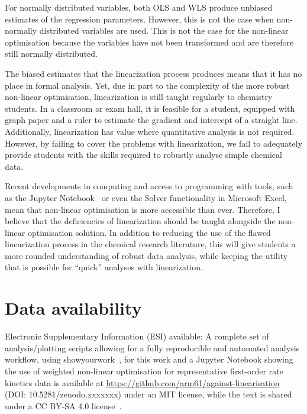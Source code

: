 \documentclass[journal=jceda8,manuscript=article]{achemso}
\begin{document}
For normally distributed variables, both OLS and WLS produce unbiased estimates of the regression parameters. 
However, this is not the case when non-normally distributed variables are used.
This is not the case for the non-linear optimisation because the variables have not been transformed and are therefore still normally distributed. 

The biased estimates that the linearization process produces means that it has no place in formal analysis. 
Yet, due in part to the complexity of the more robust non-linear optimisation, linearization is still taught regularly to chemistry students. 
In a classroom or exam hall, it is feasible for a student, equipped with graph paper and a ruler to estimate the gradient and intercept of a straight line. 
Additionally, linearization has value where quantitative analysis is not required. 
However, by failing to cover the problems with linearization, we fail to adequately provide students with the skills required to robustly analyse simple chemical data. 

Recent developments in computing and access to programming with tools, such as the Jupyter Notebook~\cite{kluyver_jupyter_2016} or even the Solver functionality in Microsoft Excel, mean that non-linear optimisation is more accessible than ever. 
Therefore, I believe that the deficiencies of linearization should be taught alongside the non-linear optimisation solution. 
In addition to reducing the use of the flawed linearization process in the chemical research literature, this will give students a more rounded understanding of robust data analysis, while keeping the utility that is possible for ``quick'' analyses with linearization.

\section*{Data availability}

Electronic Supplementary Information (ESI) available: A complete set of analysis/plotting scripts allowing for a fully reproducible and automated analysis workflow, using showyourwork~\cite{luger_showyourwork_2021}, for this work and a Jupyter Notebook showing the use of weighted non-linear optimisation for representative first-order rate kinetics data is available at \url{https://github.com/arm61/against-linearisation} (DOI: 10.5281/zenodo.xxxxxxx) under an MIT license, while the text is shared under a CC BY-SA 4.0 license~\cite{mccluskey_github_2023}.
\end{document}
